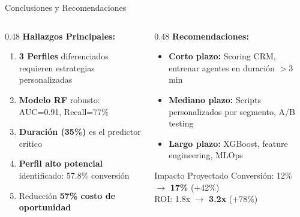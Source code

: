 \documentclass[10pt]{beamer}
\begin{document}
\begin{frame}{Conclusiones y Recomendaciones}
    \begin{columns}[T]
        \begin{column}{0.48\textwidth}
            \textbf{Hallazgos Principales:}
            \begin{enumerate}
                \item \textbf{3 Perfiles} diferenciados requieren estrategias personalizadas
                \item \textbf{Modelo RF} robusto: AUC=0.91, Recall=77\%
                \item \textbf{Duración (35\%)} es el predictor crítico
                \item \textbf{Perfil alto potencial} identificado: 57.8\% conversión
                \item Reducción \textbf{57\% costo de oportunidad}
            \end{enumerate}
        \end{column}
        
        \begin{column}{0.48\textwidth}
            \textbf{Recomendaciones:}
            \begin{itemize}
                \item \textbf{Corto plazo:} Scoring CRM, entrenar agentes en duración $>$3 min
                \item \textbf{Mediano plazo:} Scripts personalizados por segmento, A/B testing
                \item \textbf{Largo plazo:} XGBoost, feature engineering, MLOps
            \end{itemize}
            
            \vspace{0.3cm}
            \begin{alertblock}{Impacto Proyectado}
                Conversión: 12\% $\rightarrow$ \textbf{17\%} (+42\%)\\
                ROI: 1.8x $\rightarrow$ \textbf{3.2x} (+78\%)
            \end{alertblock}
        \end{column}
    \end{columns}
\end{frame}
\end{document}
